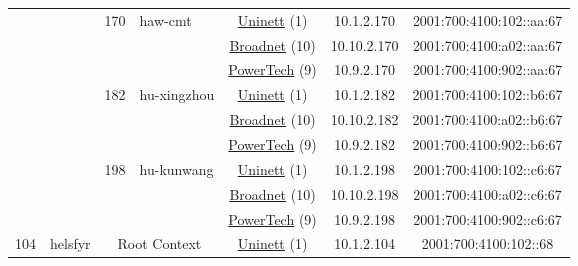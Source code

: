 \begin{small}
\begin{center}
\begin{longtable}{|c|c|c|c|c|c|c|c|}
  &  & \multirow{3}{*}{\tiny{170}} & \multicolumn{1}{|l|}{\multirow{3}{*}{\tiny{haw-cmt}}} & \multicolumn{2}{|c|}{\tiny{\href{https://www.uninett.no}{Uninett} (1)}} & \tiny{10.1.2.170} & \tiny{2001:700:4100:102::aa:67} \\* \cline{5-5}\cline{6-6}\cline{7-7}\cline{8-8}
  &  &  &  & \multicolumn{2}{|c|}{\tiny{\href{https://www.broadnet.no}{Broadnet} (10)}} & \tiny{10.10.2.170} & \tiny{2001:700:4100:a02::aa:67} \\* \cline{5-5}\cline{6-6}\cline{7-7}\cline{8-8}
  &  &  &  & \multicolumn{2}{|c|}{\tiny{\href{http://www.powertech.no}{PowerTech} (9)}} & \tiny{10.9.2.170} & \tiny{2001:700:4100:902::aa:67} \\* \cline{3-3}\cline{4-4}\cline{5-5}\cline{6-6}\cline{7-7}\cline{8-8}
  &  & \multirow{3}{*}{\tiny{182}} & \multicolumn{1}{|l|}{\multirow{3}{*}{\tiny{hu-xingzhou}}} & \multicolumn{2}{|c|}{\tiny{\href{https://www.uninett.no}{Uninett} (1)}} & \tiny{10.1.2.182} & \tiny{2001:700:4100:102::b6:67} \\* \cline{5-5}\cline{6-6}\cline{7-7}\cline{8-8}
  &  &  &  & \multicolumn{2}{|c|}{\tiny{\href{https://www.broadnet.no}{Broadnet} (10)}} & \tiny{10.10.2.182} & \tiny{2001:700:4100:a02::b6:67} \\* \cline{5-5}\cline{6-6}\cline{7-7}\cline{8-8}
  &  &  &  & \multicolumn{2}{|c|}{\tiny{\href{http://www.powertech.no}{PowerTech} (9)}} & \tiny{10.9.2.182} & \tiny{2001:700:4100:902::b6:67} \\* \cline{3-3}\cline{4-4}\cline{5-5}\cline{6-6}\cline{7-7}\cline{8-8}
  &  & \multirow{3}{*}{\tiny{198}} & \multicolumn{1}{|l|}{\multirow{3}{*}{\tiny{hu-kunwang}}} & \multicolumn{2}{|c|}{\tiny{\href{https://www.uninett.no}{Uninett} (1)}} & \tiny{10.1.2.198} & \tiny{2001:700:4100:102::c6:67} \\* \cline{5-5}\cline{6-6}\cline{7-7}\cline{8-8}
  &  &  &  & \multicolumn{2}{|c|}{\tiny{\href{https://www.broadnet.no}{Broadnet} (10)}} & \tiny{10.10.2.198} & \tiny{2001:700:4100:a02::c6:67} \\* \cline{5-5}\cline{6-6}\cline{7-7}\cline{8-8}
  &  &  &  & \multicolumn{2}{|c|}{\tiny{\href{http://www.powertech.no}{PowerTech} (9)}} & \tiny{10.9.2.198} & \tiny{2001:700:4100:902::c6:67} \\ \hline
 \multirow{36}{*}{\tiny{104}} & \multicolumn{1}{|l|}{\multirow{36}{*}{\tiny{helsfyr}}} & \multicolumn{2}{|c|}{\multirow{3}{*}{\tiny{Root Context}}} & \multicolumn{2}{|c|}{\tiny{\href{https://www.uninett.no}{Uninett} (1)}} & \tiny{10.1.2.104} & \tiny{2001:700:4100:102::68} \\* \cline{5-5}\cline{6-6}\cline{7-7}\cline{8-8}

\end{longtable}
\end{center}
\end{small}
